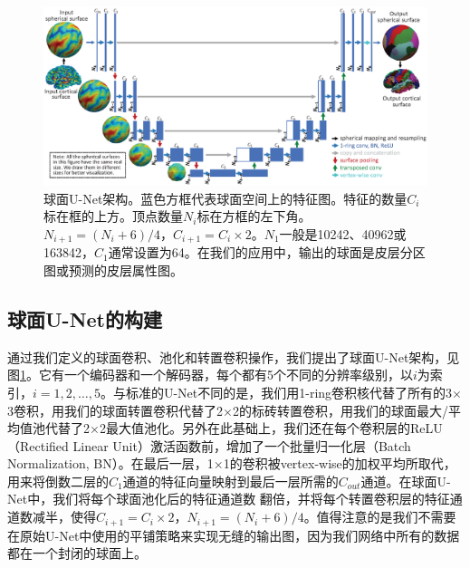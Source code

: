\begin{figure}[t]
	\centering
	\includegraphics[width=\linewidth]{figure/figure_unet.eps}
	\caption{球面U-Net架构。蓝色方框代表球面空间上的特征图。特征的数量$C_i$标在框的上方。顶点数量$N_i$标在方框的左下角。$N_{i+1}=(N_i+6)/4$，$C_{i+1}=C_i\times 2$。$N_1$一般是10242、40962或163842，$C_1$通常设置为64。在我们的应用中，输出的球面是皮层分区图或预测的皮层属性图。}
	\label{fig:fig_unet}
\end{figure}

\subsection{球面U-Net的构建}\label{sec:球面U-Net的构建}
通过我们定义的球面卷积、池化和转置卷积操作，我们提出了球面U-Net架构，见图\ref{fig:fig_unet}。它有一个编码器和一个解码器，每个都有5个不同的分辨率级别，以$i$为索引，$i=1,2,\dots,5$。与标准的U-Net\cite{ronneberger2015u}不同的是，我们用1-ring卷积核代替了所有的3$\times$3卷积，用我们的球面转置卷积代替了2$\times$2的标砖转置卷积，用我们的球面最大/平均值池代替了2$\times$2最大值池化。另外在此基础上，我们还在每个卷积层的ReLU（Rectified Linear Unit）激活函数前，增加了一个批量归一化层（Batch Normalization, BN）。在最后一层，1$\times$1的卷积被vertex-wise的加权平均所取代，用来将倒数二层的$C_1$通道的特征向量映射到最后一层所需的$C_{out}$通道。在球面U-Net中，我们将每个球面池化后的特征通道数
翻倍，并将每个转置卷积层的特征通道数减半，使得$C_{i+1}=C_i\times 2$，$N_{i+1}=(N_i+6)/4$。值得注意的是我们不需要在原始U-Net\cite{ronneberger2015u}中使用的平铺策略来实现无缝的输出图，因为我们网络中所有的数据都在一个封闭的球面上。


